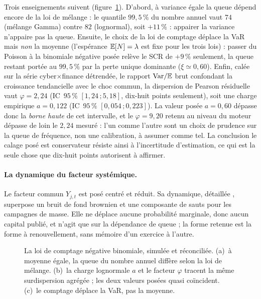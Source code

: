 Trois enseignements suivent (figure~\ref{soc:fig:nb}). D'abord, à variance égale la queue
dépend encore de la loi de mélange : le quantile $99{,}5\,\%$ du nombre annuel vaut $74$
(mélange Gamma) contre $82$ (lognormal), soit $+11\,\%$ : appairer la variance n'appaire pas
la queue. Ensuite, le choix de la loi de comptage déplace la VaR mais \emph{non} la moyenne
(l'espérance $\mathbb{E}[N]=\lambda$ est fixe pour les trois lois) : passer du Poisson à la binomiale
négative posée relève le SCR de $+9\,\%$ seulement, la queue restant portée au $99{,}5\,\%$ par
la perte unique dominante ($\xi\simeq 0{,}60$). Enfin, calée sur la série cyber$\times$finance
détrendée, le rapport $\mathrm{Var}/\mathbb{E}$ brut confondant la croissance tendancielle avec le choc
commun, la dispersion de Pearson résiduelle vaut $\varphi=2{,}24$
(IC~$95\,\%$ $[1{,}24\,;5{,}18]$, dix-huit points seulement), soit une charge empirique
$a=0{,}122$ (IC~$95\,\%$ $[0{,}054\,;0{,}223]$). La valeur posée $a=0{,}60$ dépasse donc la
\emph{borne haute} de cet intervalle, et le $\varphi=9{,}20$ retenu au niveau du moteur
dépasse de loin le $2{,}24$ mesuré : l'un comme l'autre sont un choix de prudence sur
la queue de fréquence, non une calibration, à assumer comme tel. La conclusion
\og{}le calage posé est conservateur\fg{} résiste ainsi à l'incertitude d'estimation, ce qui
est la seule chose que dix-huit points autorisent à affirmer.

\paragraph{La dynamique du facteur systémique.} Le facteur commun $Y_{j,t}$ est posé centré
et réduit. Sa dynamique, détaillée \matcomp, superpose un bruit de fond
brownien et une composante de sauts pour les campagnes de masse. Elle ne déplace aucune
probabilité marginale, donc aucun capital publié, et n'agit que sur la dépendance de queue ; la
forme retenue est la forme à renouvellement, sans mémoire d'un exercice à l'autre.

\begin{figure}[htbp]\centering
{}
\caption{La loi de comptage négative binomiale, simulée et réconciliée. (a)~à moyenne égale,
la queue du nombre annuel diffère selon la loi de mélange. (b)~la charge lognormale $a$ et le
facteur $\varphi$ tracent la même surdispersion agrégée ; les deux valeurs posées quasi
coïncident. (c)~le comptage déplace la VaR, pas la moyenne.}
\label{soc:fig:nb}
\end{figure}

